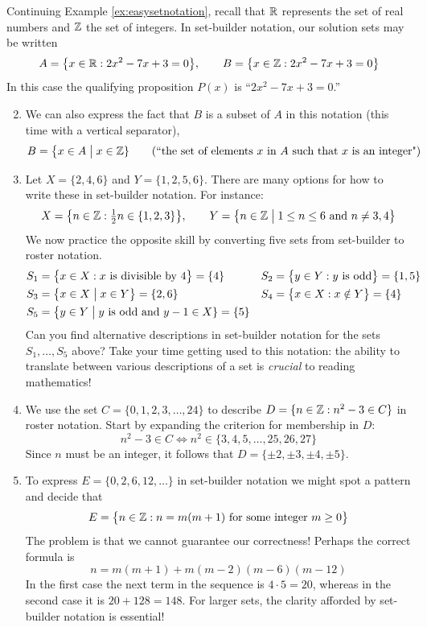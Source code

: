 \begin{examples}{}{}
\exstart Continuing Example \ref{ex:easysetnotation}, recall that $\mathbb{R}$ represents the set of real numbers and $\mathbb{Z}$ the set of integers. In set-builder notation, our solution sets may be written
	\[A=\bigl\{x\in\mathbb{R}:2x^2-7x+3=0\bigr\},\qquad B=\bigl\{x\in\mathbb{Z}:2x^2-7x+3=0\bigr\}\]
	In this case the qualifying proposition $P(x)$ is ``$2x^2-7x+3=0$.''
	\begin{enumerate}\setcounter{enumi}{1}
	  \item[]We can also express the fact that $B$ is a subset of $A$ in this notation (this time with a vertical separator),
	\[B=\bigl\{x\in A\bigm| x\in\mathbb{Z}\} \tag{``the set of elements $x$ in $A$ such that $x$ is an integer"}\]
	
	\item Let $X=\{2,4,6\}$ and $Y=\{1,2,5,6\}$. There are many options for how to write these in set-builder notation. For instance:
	\[
		X=\bigl\{n\in\mathbb{Z}:\tfrac 12n\in\{1,2,3\}\bigr\},\qquad Y=\bigl\{n\in\mathbb{Z}\bigm|1\le n\le 6\text{ and }n\neq 3,4\bigr\}
	\]
	We now practice the opposite skill by converting five sets from set-builder to roster notation.
	\begin{align*}
		&S_1=\bigl\{x\in X:x\text{ is divisible by 4}\bigr\}=\{4\}
		&&
		S_2=\bigl\{y\in Y:y\text{ is odd}\bigr\}=\{1,5\}
		\\
		&S_3=\bigl\{x\in X\bigm| x\in Y\bigr\}=\{2,6\}
		&&
		S_4=\bigl\{x\in X:x\notin Y\bigr\}=\{4\}
		\\
		&S_5=\bigl\{y\in Y\bigm| y\text{ is odd and $y-1\in X$}\}=\{5\}
	\end{align*}
	Can you find alternative descriptions in set-builder notation for the sets $S_1,\ldots,S_5$ above? Take your time getting used to this notation: the ability to translate between various descriptions of a set is \emph{crucial} to reading mathematics!
	
	\item We use the set $C=\{0,1,2,3,\ldots,24\}$ to describe $D=\{n\in\mathbb{Z}:n^2-3\in C\}$ in roster notation. Start by expanding the criterion for membership in $D$:
  \[
  	n^2-3\in C\iff n^2\in\bigl\{3,4,5,\ldots,25,26,27\bigr\}
  \]
  Since $n$ must be an integer, it follows that $D=\{\pm 2,\pm 3,\pm 4,\pm 5\}$.
  
  \item To express $E=\{0,2,6,12,\ldots\}$ in set-builder notation we might spot a pattern and decide that
  \[
  	E=\bigl\{n\in\mathbb{Z}: n=m(m+1) \text{ for some integer }m\ge 0\bigr\}
  \]
  The problem is that we cannot guarantee our correctness! Perhaps the correct formula is
  \[
  	n=m(m+1)+m(m-2)(m-6)(m-12)
  \]
	In the first case the next term in the sequence is $4\cdot 5=20$, whereas in the second case it is $20+128=148$. For larger sets, the clarity afforded by set-builder notation is essential!

	\end{enumerate}
\end{examples}



